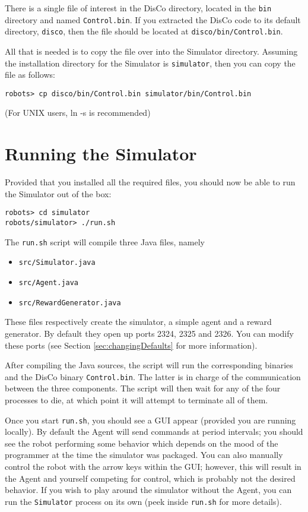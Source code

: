 \documentclass[12pt]{article}
\begin{document}
There is a single file of interest in the DisCo directory, located in the
\verb+bin+ directory and named \verb+Control.bin+. If you extracted the 
DisCo code to its default directory, \verb+disco+, then the file should 
be located at \verb+disco/bin/Control.bin+.

All that is needed is to copy the file over into the Simulator directory.
Assuming the installation directory for the Simulator is \verb+simulator+,
then you can copy the file as follows:

\begin{verbatim}
robots> cp disco/bin/Control.bin simulator/bin/Control.bin
\end{verbatim}

(For UNIX users, ln -s is recommended)

\section{Running the Simulator}

Provided that you installed all the required files, you should now be able to
run the Simulator out of the box:

\begin{verbatim}
robots> cd simulator 
robots/simulator> ./run.sh
\end{verbatim}

The \verb+run.sh+ script will compile three Java files, namely

\begin{itemize}
\item{\verb+src/Simulator.java+}
\item{\verb+src/Agent.java+}
\item{\verb+src/RewardGenerator.java+}
\end{itemize}

These files respectively create the simulator, a simple agent and a reward
generator. By default they open up ports 2324, 2325 and 2326. You can modify
these ports (see Section \ref{sec:changingDefaults} for more information).

After compiling the Java sources, the script will run the corresponding
binaries and the DisCo binary \verb+Control.bin+. The latter is in charge
of the communication between the three components. The script will then wait
for any of the four processes to die, at which point it will attempt to 
terminate all of them.

Once you start \verb+run.sh+, you should see a GUI appear (provided you are
running locally). By default the Agent will send commands at period intervals;
you should see the robot performing some behavior which depends on the mood
of the programmer at the time the simulator was packaged. You can also
manually control the robot with the arrow keys within the GUI; however, this
will result in the Agent and yourself competing for control, which is probably
not the desired behavior. If you wish to play around the simulator without
the Agent, you can run the \verb+Simulator+ process on its own (peek inside
\verb+run.sh+ for more details).

\end{document}
